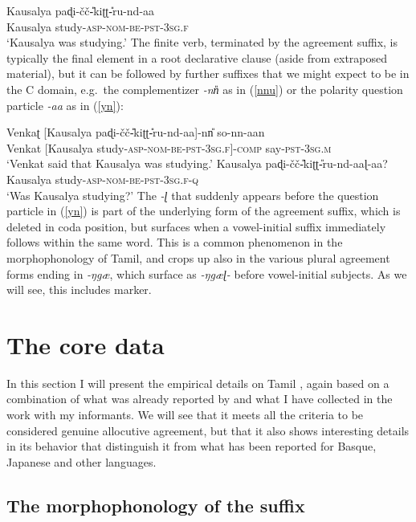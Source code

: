 \documentclass[output=paper, modfonts, nonflat]{langsci/langscibook}
\begin{document}
\ea\label{prog}\gll Kausalya paɖi-\v{c}\v{c}\U-kiʈʈ\U-ru-nd-aa\\
Kausalya study-\textsc{asp}-\textsc{nom}-\textsc{be}-\textsc{pst}-3\textsc{sg.f}\\
\glt `Kausalya was studying.'
\z
%
The finite verb, terminated by the agreement suffix, is typically the
final element in a root declarative clause (aside from extraposed
material), but it can be followed by further suffixes that we might
expect to be in the C domain, e.g.\ the complementizer \textit{-nn\U}
as in (\ref{nnu}) or the polarity question particle \textit{-aa} as in
(\ref{yn}):

\ea
  \ea\label{nnu}\gll Venkaʈ [Kausalya paɖi-\v{c}\v{c}\U-kiʈʈ\U-ru-nd-aa]-nn\U{} so-nn-aan\\
  Venkat [Kausalya  study-\textsc{asp}-\textsc{nom}-\textsc{be}-\textsc{pst}-3\textsc{sg.f}]-\textsc{comp}{} say-\textsc{pst}-3\textsc{sg.m}\\
  \glt `Venkat said that Kausalya was studying.'
  \ex\label{yn}\gll Kausalya paɖi-\v{c}\v{c}\U-kiʈʈ\U-ru-nd-aaɭ-aa?\\
  Kausalya study-\textsc{asp}-\textsc{nom}-\textsc{be}-\textsc{pst}-3\textsc{sg.f}-\textsc{q}\\
  \glt `Was Kausalya studying?'
  \z
\z
%
The \textit{-ɭ} that suddenly appears before the question particle in
(\ref{yn}) is part of the underlying form of the agreement suffix,
which is deleted in coda position, but surfaces when a vowel-initial
suffix immediately follows within the same word. This is a common
phenomenon in the morphophonology of Tamil, and crops up also in the
various plural agreement forms ending in \textit{-ŋgæ}, which surface
as \textit{-ŋgæɭ-} before vowel-initial subjects. As we will see,
this includes \allagr{} marker.


\section{The core data}

In this section I will present the empirical details on Tamil \allagr,
again based on a combination of what was already reported by
\citet{amrit:1991} and what I have collected in the work with my
informants. We will see that it meets all the criteria to be
considered genuine allocutive agreement, but that it also shows
interesting details in its behavior that distinguish it from what has
been reported for Basque, Japanese and other languages.

\subsection{The morphophonology of the suffix}
\end{document}
